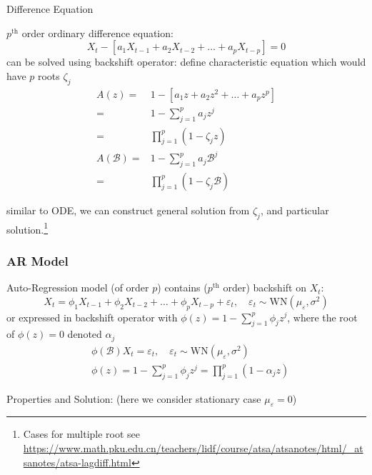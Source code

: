 \begin{point}
    Difference Equation
\end{point}

    $ p^\mathrm{th}  $ order ordinary difference equation:
    \begin{equation}
        X_t-\left[a_1X_{t-1}+a_2X_{t-2}+\ldots+a_pX_{t-p}\right]=0 
    \end{equation}
    can be solved using backshift operator: define characteristic equation which would have $ p $ roots $ \zeta _j $
    \begin{align}
        A(z)=&1-\left[a_1z+a_2z^2+\ldots+a_pz^p\right]\\
        =&1-\sum_{j=1}^pa_jz^j\\
        =&\prod_{j=1}^p(1-\zeta _jz)\\
        A(\mathscr{B} )=&1-\sum_{j=1}^pa_j\mathscr{B} ^j\\
        =&\prod_{j=1}^p(1-\zeta _j\mathscr{B} )
    \end{align}
    
    similar to ODE, we can construct general solution from $ \zeta _j $, and particular solution.\footnote{Cases for multiple root see \url{https://www.math.pku.edu.cn/teachers/lidf/course/atsa/atsanotes/html/_atsanotes/atsa-lagdiff.html}}

\subsubsection{AR Model}
    Auto-Regression model (of order $ p $) contains ($ p^\mathrm{th} $ order) backshift on $ X_t $:
    \begin{equation}
        X_t=\phi _1X_{t-1}+\phi _2X_{t-2}+\ldots+\phi _pX_{t-p}+\varepsilon _t,\quad \varepsilon _t\sim \mathrm{WN}(\mu_\varepsilon  ,\sigma ^2)  
    \end{equation}
    or expressed in backshift operator with $ \phi (z)=1-\sum_{j=1}^p\phi _jz^j $, where the root of $ \phi (z)=0 $ denoted $ \alpha _j $
    \begin{align}
        &\phi (\mathscr{B} )X_t=\varepsilon _t,\quad\varepsilon _t\sim \mathrm{WN}(\mu_\varepsilon  ,\sigma ^2)   \\
        &\phi (z)=1-\sum_{j=1}^p\phi _jz^j=\prod_{j=1}^p(1-\alpha _jz)
    \end{align}

\begin{point}
    Properties and Solution: (here we consider stationary case $ \mu_\varepsilon  =0 $)
\end{point}

